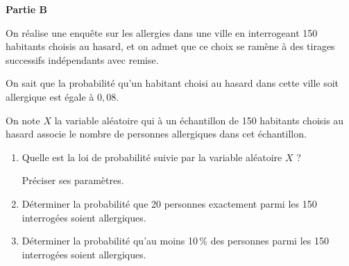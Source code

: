 \medskip

\textbf{Partie B}

\medskip

On réalise une enquête sur les allergies dans une ville en interrogeant 150 habitants choisis au hasard, et on admet que ce choix se ramène à des tirages successifs indépendants avec remise.

On sait que la probabilité qu’un habitant choisi au hasard dans cette ville soit allergique est égale à $0,08$.

On note $X$ la variable aléatoire qui à un échantillon de 150 habitants choisis au hasard associe le nombre de personnes allergiques dans cet échantillon.

\begin{enumerate}
	\item Quelle est la loi de probabilité suivie par la variable aléatoire $X$ ?
	
	Préciser ses paramètres.
	\item Déterminer la probabilité que 20 personnes exactement parmi les 150 interrogées soient allergiques.
	\item Déterminer la probabilité qu’au moins 10\,\% des personnes parmi les 150 interrogées soient allergiques.
\end{enumerate}
